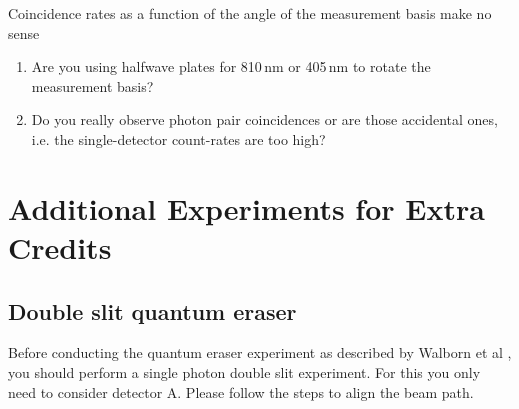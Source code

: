\documentclass{../lab}
\begin{document}
\noindent Coincidence rates as a function of the angle of the measurement basis make no sense

\begin{enumerate}
    \item Are you using halfwave plates for 810\,nm or 405\,nm to rotate the measurement basis?

    \item Do you really observe photon pair coincidences or are those accidental ones, i.e. the single-detector count-rates are too high?
\end{enumerate}


\section{Additional Experiments for Extra Credits}

\subsection{Double slit quantum eraser}

Before conducting the quantum eraser experiment as described by Walborn et al \cite{Walborn}, you should perform a single photon double slit experiment. For this you only need to consider detector A. Please follow the steps to align the beam path.
\end{document}
